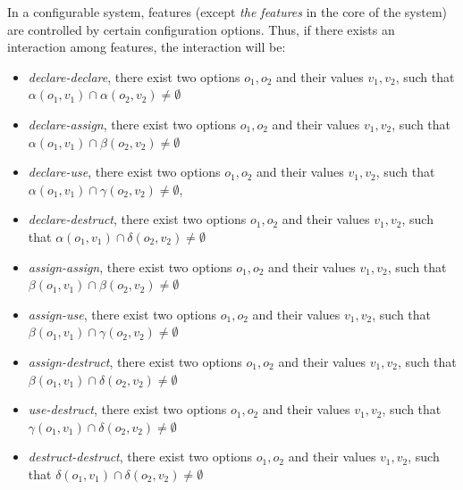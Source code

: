  In a configurable
system, features (except \textit{the features} in the core of the
system) are controlled by certain configuration options. Thus, if
there exists an interaction among features, the interaction will
be:

\begin{itemize}[leftmargin=4mm]

\item \textit{declare-declare}, there exist two options $o_1, o_2$ and their values $v_1, v_2$, such that $\alpha(o_1, v_1) \cap \alpha(o_2, v_2) \neq \emptyset$

\item \textit{declare-assign}, there exist two options $o_1, o_2$ and their values $v_1, v_2$, such that $\alpha(o_1, v_1) \cap \beta(o_2, v_2) \neq \emptyset$

\item \textit{declare-use}, there exist two options $o_1, o_2$ and their values $v_1, v_2$, such that $\alpha(o_1, v_1) \cap \gamma(o_2, v_2) \neq \emptyset$,

\item \textit{declare-destruct}, there exist two options $o_1, o_2$ and their values $v_1, v_2$, such that $\alpha(o_1, v_1) \cap \delta(o_2, v_2) \neq \emptyset$

\item \textit{assign-assign}, there exist two options $o_1, o_2$ and their values $v_1, v_2$, such that $\beta(o_1, v_1) \cap \beta(o_2, v_2) \neq \emptyset$

\item \textit{assign-use}, there exist two options $o_1, o_2$ and their values $v_1, v_2$, such that $\beta(o_1, v_1) \cap \gamma(o_2, v_2) \neq \emptyset$

\item \textit{assign-destruct}, there exist two options $o_1, o_2$ and their values $v_1, v_2$, such that $\beta(o_1, v_1) \cap \delta(o_2, v_2) \neq \emptyset$

\item \textit{use-destruct}, there exist two options $o_1, o_2$ and their values $v_1, v_2$, such that $\gamma(o_1, v_1) \cap \delta(o_2, v_2) \neq \emptyset$

\item \textit{destruct-destruct}, there exist two options $o_1, o_2$ and their values $v_1, v_2$, such that $\delta(o_1, v_1) \cap \delta(o_2, v_2) \neq \emptyset$

\end{itemize}